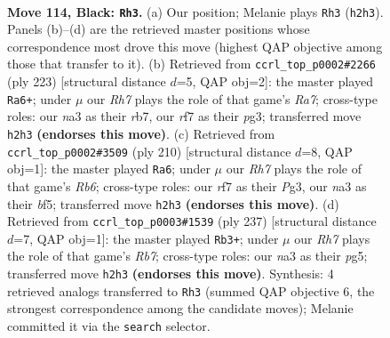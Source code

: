 \documentclass[11pt]{article}
\begin{document}
\clearpage

\begin{figure}[p]\centering
\begin{subfigure}{0.46\textwidth}\centering
\resizebox{\linewidth}{!}{%
\newchessgame
\chessboard[
  setfen={8/5R2/8/3k2K1/6P1/N7/7r/8 b - - 12 114},
  showmover=false,
  pgfstyle=straightmove, color=movearrow, markmove={h2-h3}
]}
\caption{}
\end{subfigure}\hfill
\begin{subfigure}{0.46\textwidth}\centering
\resizebox{\linewidth}{!}{%
\newchessgame
\chessboard[
  setfen={6k1/1R6/6K1/6P1/8/6P1/r7/8 b - - 20 112},
  showmover=false,
  pgfstyle=straightmove, color=movearrow, markmove={a2-a6}
]}
\caption{}
\end{subfigure}
\\[4pt]
\begin{subfigure}{0.46\textwidth}\centering
\resizebox{\linewidth}{!}{%
\newchessgame
\chessboard[
  setfen={8/5pk1/1R6/5b2/8/4K1P1/8/8 w - - 83 106},
  showmover=false,
  pgfstyle=straightmove, color=movearrow, markmove={b6-a6}
]}
\caption{}
\end{subfigure}\hfill
\begin{subfigure}{0.46\textwidth}\centering
\resizebox{\linewidth}{!}{%
\newchessgame
\chessboard[
  setfen={8/6k1/4R3/6P1/6P1/6K1/1r6/8 b - - 12 119},
  showmover=false,
  pgfstyle=straightmove, color=movearrow, markmove={b2-b3}
]}
\caption{}
\end{subfigure}
\caption{\textbf{Move 114, Black: \texttt{Rh3}.} (a) Our position; Melanie plays \texttt{Rh3} (\texttt{h2h3}). Panels (b)--(d) are the retrieved master positions whose correspondence most drove this move (highest QAP objective among those that transfer to it). (b) Retrieved from \texttt{ccrl\_top\_p0002\#2266} (ply 223) [structural distance $d$=5, QAP obj=2]: the master played \texttt{Ra6+}; under $\mu$ our \emph{Rh7} plays the role of that game's \emph{Ra7}; cross-type roles: our \emph{n}a3 as their \emph{r}b7, our \emph{r}f7 as their \emph{p}g3; transferred move \texttt{h2h3} \textbf{(endorses this move)}. (c) Retrieved from \texttt{ccrl\_top\_p0002\#3509} (ply 210) [structural distance $d$=8, QAP obj=1]: the master played \texttt{Ra6}; under $\mu$ our \emph{Rh7} plays the role of that game's \emph{Rb6}; cross-type roles: our \emph{r}f7 as their \emph{P}g3, our \emph{n}a3 as their \emph{b}f5; transferred move \texttt{h2h3} \textbf{(endorses this move)}. (d) Retrieved from \texttt{ccrl\_top\_p0003\#1539} (ply 237) [structural distance $d$=7, QAP obj=1]: the master played \texttt{Rb3+}; under $\mu$ our \emph{Rh7} plays the role of that game's \emph{Rb7}; cross-type roles: our \emph{n}a3 as their \emph{p}g5; transferred move \texttt{h2h3} \textbf{(endorses this move)}. Synthesis: 4 retrieved analogs transferred to \texttt{Rh3} (summed QAP objective 6, the strongest correspondence among the candidate moves); Melanie committed it via the \texttt{search} selector.}
\label{fig:thought-m227}
\end{figure}
\end{document}
